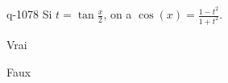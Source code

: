 \begin{truefalse}{q-1078}
Si $t=\tan\frac{x}{2}$, on a $\cos(x)=\frac{1-t^2}{1+t^2}$.
\item* Vrai
\item Faux
\end{truefalse}

